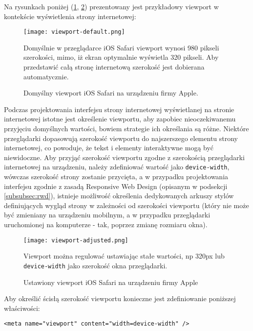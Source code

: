 Na rysunkach poniżej (\ref{fig:viewport-default}, \ref{fig:viewport-adjusted}) prezentowany jest przykładowy viewport w kontekście wyświetlenia strony internetowej:

\begin{figure}[h!]
  \centering
    \texttt{[image: viewport-default.png]}
  \caption[Apple default viewport w Safari iOS]{Domyślny viewport iOS Safari na urządzeniu firmy Apple.}
    Domyślnie w przeglądarce iOS Safari viewport wynosi 980 pikseli szerokości, mimo, iż ekran optymalnie wyświetla 320 pikseli. Aby przedstawić całą stronę internetową szerokość jest dobierana automatycznie\cite{browser-ios-safari}.
  \label{fig:viewport-default}
\end{figure}

Podczas projektowania interfejsu strony internetowej wyświetlanej na stronie internetowej istotne jest określenie viewportu, aby zapobiec nieoczekiwanemu przyjęciu domyślnych wartości, bowiem strategie ich określania są różne. Niektóre przeglądarki dopasowują szerokość viewportu do najszerszego elementu strony internetowej, co powoduje, że tekst i elementy interaktywne mogą być niewidoczne. Aby przyjąć szerokość viewportu zgodne z szerokością przeglądarki internetowej na urządzeniu, należy zdefiniować wartość jako \lstinline{device-width}, wówczas szerokość strony zostanie przycięta, a w przypadku projektowania interfejsu zgodnie z zasadą Responsive Web Design (opisanym w podsekcji \ref{subsubsec:rwd}), istnieje możliwość określenia dedykowanych arkuszy stylów definiujących wygląd strony w zależności od szerokości viewportu (który nie może być zmieniany na urządzeniu mobilnym, a w przypadku przeglądarki uruchomionej na komputerze - tak, poprzez zmianę rozmiaru okna).

\begin{figure}[h!]
  \centering
    \texttt{[image: viewport-adjusted.png]}
  \caption[Apple fixed viewport w Safari iOS]{Ustawiony viewport iOS Safari na urządzeniu firmy Apple}
    Viewport można regulować ustawiając stałe wartości, np 320px lub \lstinline{device-width} jako szerokość okna przeglądarki\cite{browser-ios-safari}.
  \label{fig:viewport-adjusted}
\end{figure}

Aby określić ścisłą szerokość viewportu konieczne jest zdefiniowanie poniższej właściwości:

\lstset{language=HTML}
\begin{lstlisting}
<meta name="viewport" content="width=device-width" />
\end{lstlisting}

